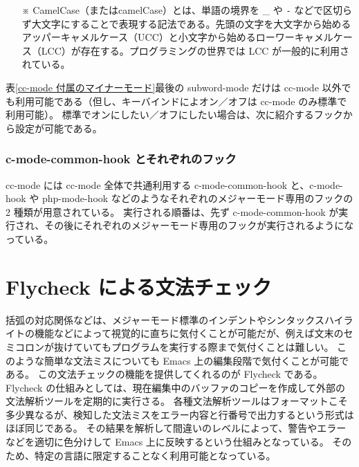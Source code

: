 \begin{itemize}\setlength{\leftskip}{-1.00zw}%
\item[※] CamelCase（またはcamelCase）とは、単語の境界を \_ や \verb|-| などで区切らず大文字にすることで表現する記法である。先頭の文字を大文字から始めるアッパーキャメルケース（UCC）と小文字から始めるローワーキャメルケース（LCC）が存在する。プログラミングの世界では LCC が一般的に利用されている。
\end{itemize}
表\ref{cc-mode 付属のマイナーモード}最後の subword-mode だけは cc-mode 以外でも利用可能である（但し、キーバインドによオン／オフは cc-mode のみ標準で利用可能）。
標準でオンにしたい／オフにしたい場合は、次に紹介するフックから設定が可能である。
\subsubsection{c-mode-common-hook とそれぞれのフック}
cc-mode には cc-mode 全体で共通利用する c-mode-common-hook と、c-mode-hook や php-mode-hook などのようなそれぞれのメジャーモード専用のフックの 2 種類が用意されている。
実行される順番は、先ず c-mode-common-hook が実行され、その後にそれぞれのメジャーモード専用のフックが実行されるようになっている。
\section{Flycheck による文法チェック}
括弧の対応関係などは、メジャーモード標準のインデントやシンタックスハイライトの機能などによって視覚的に直ちに気付くことが可能だが、例えば文末のセミコロンが抜けていてもプログラムを実行する際まで気付くことは難しい。
このような簡単な文法ミスについても Emacs 上の編集段階で気付くことが可能である。
この文法チェックの機能を提供してくれるのが Flycheck である。\\

Flycheck の仕組みとしては、現在編集中のバッファのコピーを作成して外部の文法解析ツールを定期的に実行さる。
各種文法解析ツールはフォーマットこそ多少異なるが、検知した文法ミスをエラー内容と行番号で出力するという形式はほぼ同じである。
その結果を解析して間違いのレベルによって、警告やエラーなどを適切に色分けして Emacs 上に反映するという仕組みとなっている。
そのため、特定の言語に限定することなく利用可能となっている。
